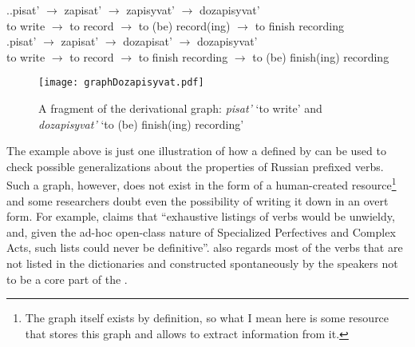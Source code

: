 \ex.\label{deriv:dozapisyvat}\ag.\label{deriv:dozapisyvat1}pisat'\textsuperscript{\IPF} $\rightarrow$ zapisat'\textsuperscript{\PF} $\rightarrow$ zapisyvat'\textsuperscript{\IPF} $\rightarrow$ dozapisyvat'\textsuperscript{\PF}\\
{to write} $\rightarrow$ {to record} $\rightarrow$ {to (be) record(ing)} $\rightarrow$ {to finish recording}\\
\bg.\label{deriv:dozapisyvat2}pisat'\textsuperscript{\IPF} $\rightarrow$ zapisat'\textsuperscript{\PF} $\rightarrow$ dozapisat'\textsuperscript{\PF} $\rightarrow$ dozapisyvat'\textsuperscript{\IPF}\\
{to write} $\rightarrow$ {to record} $\rightarrow$ {to finish recording} $\rightarrow$ {to (be) finish(ing) recording}\\				

\begin{figure}
\begin{center}
\texttt{[image: graphDozapisyvat.pdf]}
\caption{A fragment of the derivational graph: \textit{pisat'} `to write' and \textit{dozapisyvat'} `to (be) finish(ing) recording'\label{tree:dozapisyvat}}
\end{center}
\end{figure}			

The example above is just one illustration of how a  defined by  can be used to check possible generalizations about the properties of Russian prefixed verbs. Such a graph, however, does not exist in the form of a human-created resource\footnote{The graph itself exists by definition, so what I mean here is some resource that stores this graph and allows to extract information from it.} and some researchers doubt even the possibility of writing it down in an overt form. For example, \citet[625]{Janda:07a} claims that ``exhaustive listings of verbs would be unwieldy, and, given the ad-hoc open-class nature of Specialized Perfectives and Complex Acts, such lists could never be definitive''. \citet[626]{Janda:07a} also regards most of the verbs that are not listed in the dictionaries and constructed spontaneously by the speakers not to be a core part of the .

